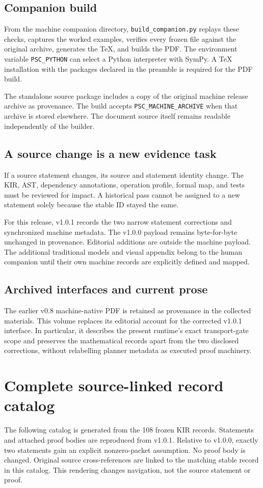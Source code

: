 \documentclass[a4paper,11pt]{article}
\begin{document}
\subsection{Companion build}
From the machine companion directory, \nolinkurl{build_companion.py} replays these checks, captures the worked examples, verifies every frozen file against the original archive, generates the TeX, and builds the PDF. The environment variable \nolinkurl{PSC_PYTHON} can select a Python interpreter with SymPy. A TeX installation with the packages declared in the preamble is required for the PDF build.

The standalone source package includes a copy of the original machine release archive as provenance. The build accepts \nolinkurl{PSC_MACHINE_ARCHIVE} when that archive is stored elsewhere. The document source itself remains readable independently of the builder.
\subsection{A source change is a new evidence task}
If a source statement changes, its source and statement identity change. The KIR, AST, dependency annotations, operation profile, formal map, and tests must be reviewed for impact. A historical pass cannot be assigned to a new statement solely because the stable ID stayed the same.

For this release, v1.0.1 records the two narrow statement corrections and synchronized machine metadata. The v1.0.0 payload remains byte-for-byte unchanged in provenance. Editorial additions are outside the machine payload. The additional traditional models and visual appendix belong to the human companion until their own machine records are explicitly defined and mapped.
\subsection{Archived interfaces and current prose}
The earlier v0.8 machine-native PDF is retained as provenance in the collected materials. This volume replaces its editorial account for the corrected v1.0.1 interface. In particular, it describes the present runtime's exact transport-gate scope and preserves the mathematical records apart from the two disclosed corrections, without relabelling planner metadata as executed proof machinery.

\clearpage\appendix
\section{Complete source-linked record catalog}\label{app:catalog}
The following catalog is generated from the 108 frozen KIR records. Statements and attached proof bodies are reproduced from v1.0.1. Relative to v1.0.0, exactly two statements gain an explicit nonzero-packet assumption. No proof body is changed. Original source cross-references are linked to the matching stable record in this catalog. This rendering changes navigation, not the source statement or proof.
\end{document}
